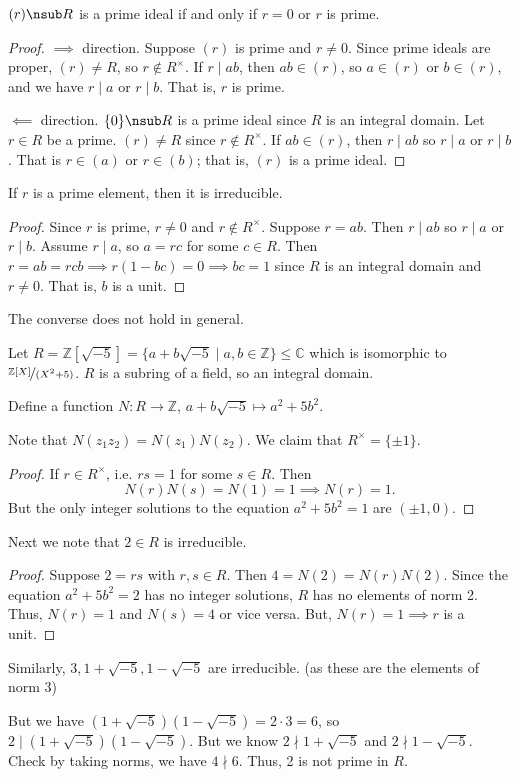 \begin{lemma}
    \((r) \nsub R\) is a prime ideal if and only if \(r = 0\) or \(r\) is prime.
\end{lemma}
\begin{proof}
    \(\implies\) direction. Suppose \((r)\) is prime and \(r \neq 0\). Since prime ideals are proper, \((r) \neq R\), so \(r \notin R^\times \). If \(r \mid ab\), then \(ab \in (r)\), so \(a \in (r)\) or \(b \in (r)\), and we have \(r\mid a\) or \(r \mid b\). That is, \(r\) is prime.

    \(\impliedby\) direction. \(\{0\}\nsub R\) is a prime ideal since \(R\) is an integral domain. Let \(r \in R\) be a prime. \((r) \neq R\) since \(r \notin R^\times \). If \(ab \in (r)\), then \(r \mid ab\) so \(r \mid a\) or \(r \mid b\). That is \(r \in (a)\) or \(r \in (b)\); that is, \((r)\) is a prime ideal.
\end{proof}
\begin{lemma}
    If \(r\) is a prime element, then it is irreducible.
\end{lemma}
\begin{proof}
    Since \(r\) is prime, \(r\neq 0\) and \(r \notin R^\times \). Suppose \(r = ab\). Then \(r \mid ab\) so \(r \mid a\) or \(r \mid b\). Assume \(r \mid a\), so \(a = rc\) for some \(c \in R\). Then \(r = ab = rcb\implies r(1-bc)=0\implies bc = 1\) since \(R\) is an integral domain and \(r\neq 0\). That is, \(b\) is a unit.
\end{proof}
The converse does not hold in general.
\begin{example}
    Let \(R=\mathbb{Z}[\sqrt{-5}] = \{a + b\sqrt{-5} \mid a,b \in \mathbb{Z}\}\leq \mathbb{C}\) which is isomorphic to \(\nicefrac{\mathbb{Z}[X]}{(X^2 + 5)}\). \(R\) is a subring of a field, so an integral domain.

    Define a function \(N: R \to \mathbb{Z}\), \(a + b\sqrt{-5} \mapsto a^2 + 5b^2\).

    Note that \(N(z_1 z_2) = N(z_1) N(z_2)\). We claim that \(R^\times = \{\pm 1\}\).
    \begin{proof}
        If \(r \in R^\times \), i.e. \(rs = 1\) for some \(s \in R\). Then
        \[
            N(r)N(s) = N(1) = 1 \implies N(r) = 1.
        \]
        But the only integer solutions to the equation \(a^2 + 5b^2 = 1\) are \((\pm 1,0)\).
    \end{proof}
    Next we note that \(2 \in R\) is irreducible.
    \begin{proof}
        Suppose \(2 = rs\) with \(r,s \in R\). Then \(4 = N(2) = N(r)N(2)\). Since the equation \(a^2 + 5b^2 = 2\) has no integer solutions, \(R\) has no elements of norm 2. Thus, \(N(r) = 1\) and \(N(s) = 4\) or vice versa. But, \(N(r) = 1 \implies r\) is a unit.
    \end{proof}
    Similarly, \(3,1 + \sqrt{-5}, 1 - \sqrt{-5} \) are irreducible. (as these are the elements of norm 3)
    
    But we have \((1+\sqrt{-5} )(1-\sqrt{-5}) = 2 \cdot 3 = 6\), so \(2 \mid (1 + \sqrt{-5})(1 - \sqrt{-5})\). But we know \(2 \nmid 1 + \sqrt{-5} \) and \(2 \nmid 1 - \sqrt{-5} \). Check by taking norms, we have \(4 \nmid 6\). Thus, 2 is not prime in \(R\).
\end{example}
